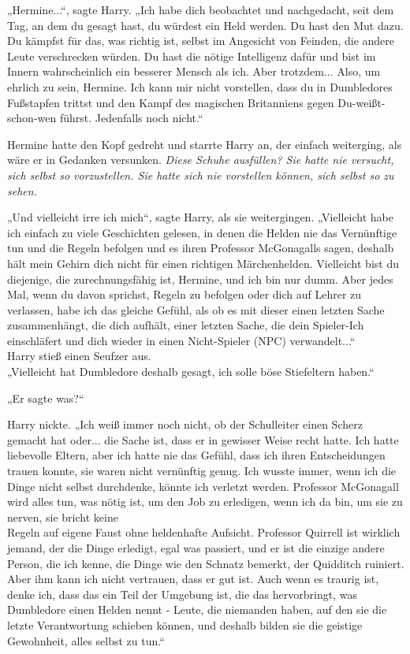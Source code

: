 {„Hermine...“, sagte Harry. „Ich habe dich beobachtet und nachgedacht, seit dem Tag, an dem du gesagt hast, du würdest ein Held werden. Du hast den Mut dazu. Du kämpfst für das, was richtig ist, selbst im Angesicht von Feinden, die andere Leute verschrecken würden. Du hast die nötige Intelligenz dafür und bist im Innern wahrscheinlich ein besserer Mensch als ich. Aber trotzdem... Also, um ehrlich zu sein, Hermine. Ich kann mir nicht vorstellen, dass du in Dumbledores Fußstapfen trittst und den Kampf des magischen Britanniens gegen Du-weißt-schon-wen führst. Jedenfalls noch nicht.“

Hermine hatte den Kopf gedreht und starrte Harry an, der einfach weiterging, als wäre er in Gedanken versunken. \emph{Diese Schuhe ausfüllen? Sie hatte nie versucht, sich selbst so vorzustellen. Sie hatte sich nie vorstellen können, sich selbst so zu sehen.}

„Und vielleicht irre ich mich“, sagte Harry, als sie weitergingen. „Vielleicht habe ich einfach zu viele Geschichten gelesen, in denen die Helden nie das Vernünftige tun und die Regeln befolgen und es ihren Professor McGonagalls sagen, deshalb hält mein Gehirn dich nicht für einen richtigen Märchenhelden. Vielleicht bist du diejenige, die zurechnungsfähig ist, Hermine, und ich bin nur dumm. Aber jedes Mal, wenn du davon sprichst, Regeln zu befolgen oder dich auf Lehrer zu verlassen, habe ich das gleiche Gefühl, als ob es mit dieser einen letzten Sache zusammenhängt, die dich aufhält, einer letzten Sache, die dein Spieler-Ich einschläfert und dich wieder in einen Nicht-Spieler (NPC) verwandelt...“\\ Harry stieß einen Seufzer aus.\\ „Vielleicht hat Dumbledore deshalb gesagt, ich solle böse Stiefeltern haben.“

„Er sagte was?“

Harry nickte. „Ich weiß immer noch nicht, ob der Schulleiter einen Scherz gemacht hat oder... die Sache ist, dass er in gewisser Weise recht hatte. Ich hatte liebevolle Eltern, aber ich hatte nie das Gefühl, dass ich ihren Entscheidungen trauen konnte, sie waren nicht vernünftig genug. Ich wusste immer, wenn ich die Dinge nicht selbst durchdenke, könnte ich verletzt werden. Professor McGonagall wird alles tun, was nötig ist, um den Job zu erledigen, wenn ich da bin, um sie zu nerven, sie bricht keine\\ Regeln auf eigene Faust ohne heldenhafte Aufsicht. Professor Quirrell ist wirklich jemand, der die Dinge erledigt, egal was passiert, und er ist die einzige andere Person, die ich kenne, die Dinge wie den Schnatz bemerkt, der Quidditch ruiniert. Aber ihm kann ich nicht vertrauen, dass er gut ist. Auch wenn es traurig ist, denke ich, dass das ein Teil der Umgebung ist, die das hervorbringt, was Dumbledore einen Helden nennt - Leute, die niemanden haben, auf den sie die letzte Verantwortung schieben können, und deshalb bilden sie die geistige Gewohnheit, alles selbst zu tun.“

}
